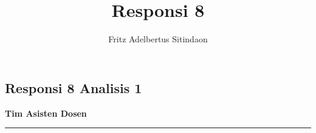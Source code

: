 \documentclass{article}
\title{Responsi 8}
\author{Fritz Adelbertus Sitindaon}
\date{}
\begin{document}
\begin{flushright}
    \section*{Responsi 8 Analisis 1}
    \textbf{Tim Asisten Dosen}
\end{flushright}


\vspace{0.5cm}\hrule height 2pt\vspace{0.5cm}
\end{document}
